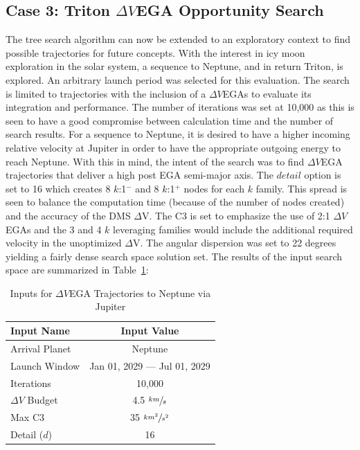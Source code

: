 \documentclass[letterpaper, paper,11pt]{./AAS}		%
\begin{document}
\subsection{Case 3: Triton $\Delta V$EGA Opportunity Search}
The tree search algorithm can now be extended to an exploratory context to find possible trajectories for future concepts. With the interest in icy moon exploration in the solar system, a sequence to Neptune, and in return Triton, is explored\cite{Hubbard2010}. An arbitrary launch period was selected for this evaluation. The search is limited to trajectories with the inclusion of a $\Delta V$EGAs to evaluate its integration and performance. The number of iterations was set at 10,000 as this is seen to have a good compromise between calculation time and the number of search results. For a sequence to Neptune, it is desired to have a higher incoming relative velocity at Jupiter in order to have the appropriate outgoing energy to reach Neptune. With this in mind, the intent of the search was to find $\Delta V$EGA trajectories that deliver a high post EGA semi-major axis. The $\textit{detail}$ option is set to 16 which creates 8 $k$:1$^{-}$ and 8 $k$:1$^{+}$ nodes for each $k$ family. This spread is seen to balance the computation time (because of the number of nodes created) and the accuracy of the  DMS $\Delta$V. The C3 is set to emphasize the use of 2:1 $\Delta V$EGAs and the 3 and 4 $k$ leveraging families  would include the additional required velocity in the unoptimized $\Delta$V. The angular dispersion was set to 22 degrees yielding a fairly dense search space solution set. The results of the input search space are summarized in Table~\ref{tab:tritonInputs}:
%
%
\begin{table}[h]
    \begin{center}
        \caption{Inputs for $\Delta V$EGA Trajectories to Neptune via Jupiter}
        \label{tab:tritonInputs}
        \begin{tabular}{l|c}
					\toprule
            \textbf{Input Name} & \textbf{Input Value}\\
            \hline
            Arrival Planet & Neptune \\
            Launch Window \quad \quad & Jan 01, 2029 --- Jul 01, 2029 \\
            Iterations & 10,000 \\
            $\Delta V$ Budget & 4.5 $\sfrac{km}{s}$ \\
            Max C3 & 35 $\sfrac{km^2}{s^2}$ \\
            Detail ($d$) & 16 \\
						\bottomrule
        \end{tabular}
    \end{center}
\end{table}
\end{document}
